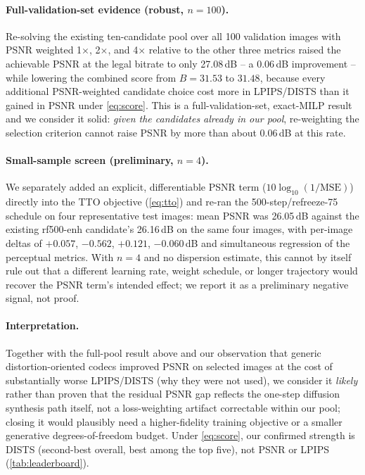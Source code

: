 \documentclass[runningheads]{llncs}
\begin{document}
\paragraph{Full-validation-set evidence (robust, $n{=}100$).} Re-solving the existing ten-candidate pool over all 100 validation images with PSNR weighted 1$\times$, 2$\times$, and 4$\times$ relative to the other three metrics raised the achievable PSNR at the legal bitrate to only 27.08\,dB -- a 0.06\,dB improvement -- while lowering the combined score from $B{=}31.53$ to $31.48$, because every additional PSNR-weighted candidate choice cost more in LPIPS/DISTS than it gained in PSNR under \cref{eq:score}. This is a full-validation-set, exact-MILP result and we consider it solid: \emph{given the candidates already in our pool}, re-weighting the selection criterion cannot raise PSNR by more than about 0.06\,dB at this rate.

\paragraph{Small-sample screen (preliminary, $n{=}4$).} We separately added an explicit, differentiable PSNR term ($10\log_{10}(1/\mathrm{MSE})$) directly into the TTO objective (\cref{eq:tto}) and re-ran the 500-step/refreeze-75 schedule on four representative test images: mean PSNR was 26.05\,dB against the existing rf500-enh candidate's 26.16\,dB on the same four images, with per-image deltas of $+0.057$, $-0.562$, $+0.121$, $-0.060$\,dB and simultaneous regression of the perceptual metrics. With $n{=}4$ and no dispersion estimate, this cannot by itself rule out that a different learning rate, weight schedule, or longer trajectory would recover the PSNR term's intended effect; we report it as a preliminary negative signal, not proof.

\paragraph{Interpretation.} Together with the full-pool result above and our observation that generic distortion-oriented codecs improved PSNR on selected images at the cost of substantially worse LPIPS/DISTS (why they were not used), we consider it \emph{likely} rather than proven that the residual PSNR gap reflects the one-step diffusion synthesis path itself, not a loss-weighting artifact correctable within our pool; closing it would plausibly need a higher-fidelity training objective or a smaller generative degrees-of-freedom budget. Under \cref{eq:score}, our confirmed strength is DISTS (second-best overall, best among the top five), not PSNR or LPIPS (\cref{tab:leaderboard}).
\end{document}
